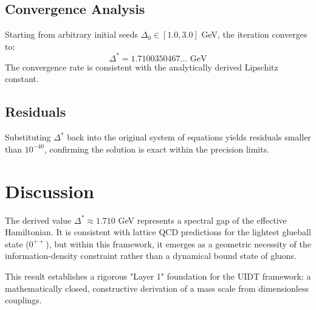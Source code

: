 \documentclass{article}
\begin{document}
\subsection{Convergence Analysis}
Starting from arbitrary initial seeds $\Delta_0 \in [1.0, 3.0]$ GeV, the iteration converges to:
$$ \Delta^* = 1.7100350467\dots \text{ GeV} $$
The convergence rate is consistent with the analytically derived Lipschitz constant.

\subsection{Residuals}
Substituting $\Delta^*$ back into the original system of equations yields residuals smaller than $10^{-40}$, confirming the solution is exact within the precision limits.

\section{Discussion}
The derived value $\Delta^* \approx 1.710$ GeV represents a spectral gap of the effective Hamiltonian. It is consistent with lattice QCD predictions for the lightest glueball state ($0^{++}$), but within this framework, it emerges as a geometric necessity of the information-density constraint rather than a dynamical bound state of gluons.

This result establishes a rigorous "Layer 1" foundation for the UIDT framework: a mathematically closed, constructive derivation of a mass scale from dimensionless couplings.
\end{document}
